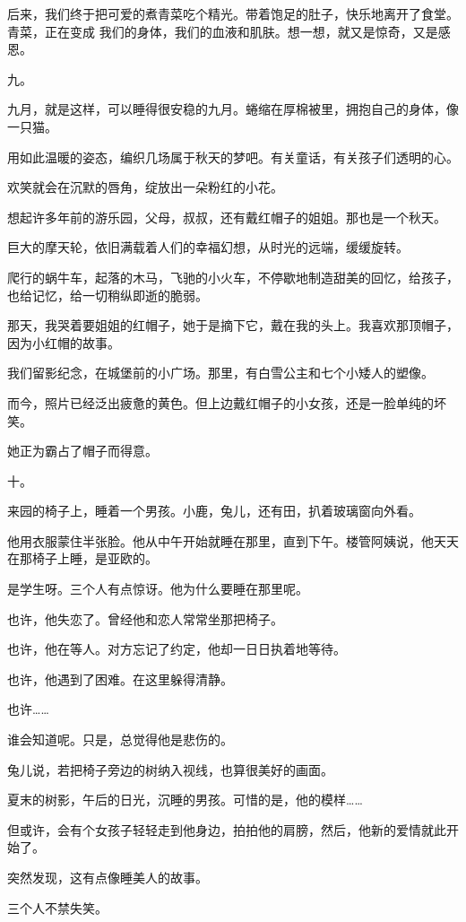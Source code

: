 \documentclass[12pt,a4paper]{article}
\newcommand{\subpart}[1]{
	\begingroup \par
	\vspace{1ex} \centering #1
	\par \endgroup
}
\begin{document}
		后来，我们终于把可爱的煮青菜吃个精光。带着饱足的肚子，快乐地离开了食堂。青菜，正在变成
	我们的身体，我们的血液和肌肤。想一想，就又是惊奇，又是感恩。

	\endwriting



		\subpart{九。}

		九月，就是这样，可以睡得很安稳的九月。蜷缩在厚棉被里，拥抱自己的身体，像一只猫。\par
		用如此温暖的姿态，编织几场属于秋天的梦吧。有关童话，有关孩子们透明的心。\par
		欢笑就会在沉默的唇角，绽放出一朵粉红的小花。\par
		想起许多年前的游乐园，父母，叔叔，还有戴红帽子的姐姐。那也是一个秋天。\par
		巨大的摩天轮，依旧满载着人们的幸福幻想，从时光的远端，缓缓旋转。\par
		爬行的蜗牛车，起落的木马，飞驰的小火车，不停歇地制造甜美的回忆，给孩子，也给记忆，给一切稍纵即逝的脆弱。\par
		那天，我哭着要姐姐的红帽子，她于是摘下它，戴在我的头上。我喜欢那顶帽子，因为小红帽的故事。\par
		我们留影纪念，在城堡前的小广场。那里，有白雪公主和七个小矮人的塑像。\par
		而今，照片已经泛出疲惫的黄色。但上边戴红帽子的小女孩，还是一脸单纯的坏笑。\par
		她正为霸占了帽子而得意。

		\subpart{十。}

		来园的椅子上，睡着一个男孩。小鹿，兔儿，还有田，扒着玻璃窗向外看。\par
		他用衣服蒙住半张脸。他从中午开始就睡在那里，直到下午。楼管阿姨说，他天天在那椅子上睡，是亚欧的。\par
		是学生呀。三个人有点惊讶。他为什么要睡在那里呢。\par
		也许，他失恋了。曾经他和恋人常常坐那把椅子。\par
		也许，他在等人。对方忘记了约定，他却一日日执着地等待。\par
		也许，他遇到了困难。在这里躲得清静。\par
		也许……\par
		谁会知道呢。只是，总觉得他是悲伤的。\par
		兔儿说，若把椅子旁边的树纳入视线，也算很美好的画面。\par
		夏末的树影，午后的日光，沉睡的男孩。可惜的是，他的模样……\par
		但或许，会有个女孩子轻轻走到他身边，拍拍他的肩膀，然后，他新的爱情就此开始了。\par
		突然发现，这有点像睡美人的故事。\par
		三个人不禁失笑。
\end{document}
